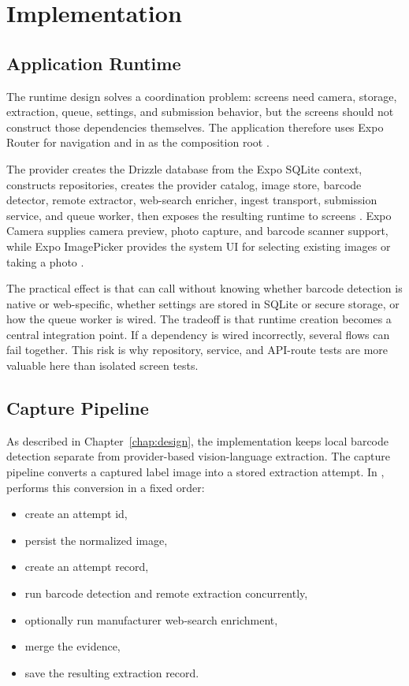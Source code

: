\chapter{Implementation}
\label{chap:implementation}

\section{Application Runtime}

The runtime design solves a coordination problem: screens need camera, storage, extraction, queue, settings, and submission behavior, but the screens should not construct those dependencies themselves. The application therefore uses Expo Router for navigation and  in  as the composition root \cite{expo-router}.

The provider creates the Drizzle database from the Expo SQLite context, constructs repositories, creates the provider catalog, image store, barcode detector, remote extractor, web-search enricher, ingest transport, submission service, and queue worker, then exposes the resulting runtime to screens \cite{drizzle,expo-sqlite}. Expo Camera supplies camera preview, photo capture, and barcode scanner support, while Expo ImagePicker provides the system UI for selecting existing images or taking a photo \cite{expo-camera,expo-imagepicker}.

The practical effect is that  can call  without knowing whether barcode detection is native or web-specific, whether settings are stored in SQLite or secure storage, or how the queue worker is wired. The tradeoff is that runtime creation becomes a central integration point. If a dependency is wired incorrectly, several flows can fail together. This risk is why repository, service, and API-route tests are more valuable here than isolated screen tests.

\section{Capture Pipeline}

As described in Chapter~\ref{chap:design}, the implementation keeps local barcode detection separate from provider-based vision-language extraction. The capture pipeline converts a captured label image into a stored extraction attempt. In ,  performs this conversion in a fixed order:
\begin{itemize}
  \item create an attempt id,
  \item persist the normalized image,
  \item create an attempt record,
  \item run barcode detection and remote extraction concurrently,
  \item optionally run manufacturer web-search enrichment,
  \item merge the evidence,
  \item save the resulting extraction record.
\end{itemize}

